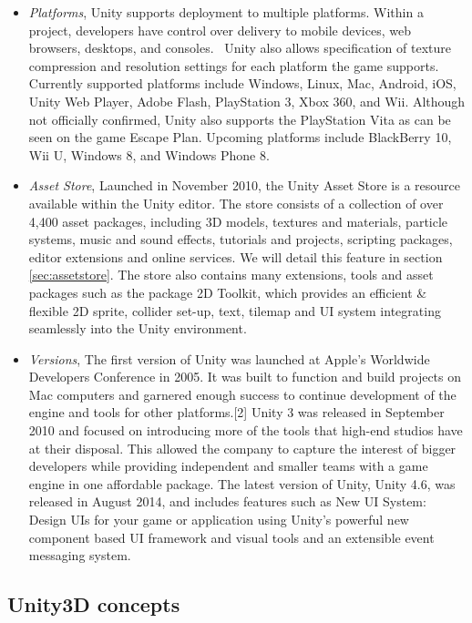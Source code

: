 \begin{itemize}
\item \textit{Platforms}, Unity supports deployment to multiple platforms. Within a project, developers
have control over delivery to mobile devices, web browsers, desktops, and consoles.~\cite{unitypress2}
Unity also allows specification of texture compression and resolution settings for each platform the game supports.~\cite{unitypress2}
Currently supported platforms include Windows, Linux, Mac, Android, iOS, Unity Web Player, Adobe Flash, PlayStation 3, Xbox 360, and Wii. Although not officially confirmed, Unity also supports the PlayStation Vita as can be seen on the game Escape Plan. Upcoming platforms include BlackBerry 10, Wii U, Windows 8, and Windows Phone 8.
\item \textit{Asset Store}, Launched in November 2010, the Unity Asset Store is a resource available
within the Unity editor. The store consists of a collection of over 4,400 asset packages, including 3D models, textures and materials, particle systems, music and sound effects, tutorials and projects, scripting packages, editor extensions and online services. We will detail this feature in section \ref{sec:assetstore}. The store also contains many extensions, tools and asset packages such as the package 2D Toolkit, which provides an efficient \& flexible 2D sprite, collider set-up, text, tilemap and UI system integrating seamlessly into the Unity environment.
\item \textit{Versions}, The first version of Unity was launched at Apple’s Worldwide Developers Conference in 2005. It was built to function and build projects on Mac computers and garnered enough success to continue development of the engine and tools for other platforms.[2] Unity 3 was released in September 2010 and focused on introducing more of the tools that high-end studios have at their disposal. This allowed the company to capture the interest of bigger developers while providing independent and smaller teams with a game engine in one affordable package. The latest version of Unity, Unity 4.6, was released in August 2014, and includes features such as New UI System: Design UIs for your game or application using Unity's powerful new component based UI framework and visual tools and an extensible event messaging system.
\end{itemize}

\subsection{Unity3D concepts}
\label{subsec:unityconcepts}

